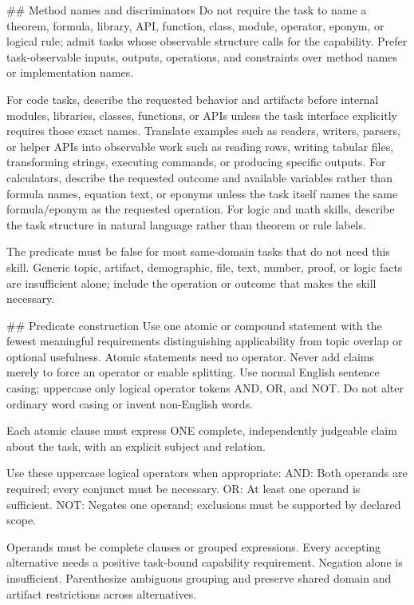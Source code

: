 \#\# Method names and discriminators Do not require the task to name a theorem, formula, library, API, function, class, module, operator, eponym, or logical rule; admit tasks whose observable structure calls for the capability. Prefer task-observable inputs, outputs, operations, and constraints over method names or implementation names.
\par\smallskip
For code tasks, describe the requested behavior and artifacts before internal modules, libraries, classes, functions, or APIs unless the task interface explicitly requires those exact names. Translate examples such as readers, writers, parsers, or helper APIs into observable work such as reading rows, writing tabular files, transforming strings, executing commands, or producing specific outputs. For calculators, describe the requested outcome and available variables rather than formula names, equation text, or eponyms unless the task itself names the same formula/eponym as the requested operation. For logic and math skills, describe the task structure in natural language rather than theorem or rule labels.
\par\smallskip
The predicate must be false for most same-domain tasks that do not need this skill. Generic topic, artifact, demographic, file, text, number, proof, or logic facts are insufficient alone; include the operation or outcome that makes the skill necessary.
\par\smallskip
\#\# Predicate construction Use one atomic or compound statement with the fewest meaningful requirements distinguishing applicability from topic overlap or optional usefulness. Atomic statements need no operator. Never add claims merely to force an operator or enable splitting. Use normal English sentence casing; uppercase only logical operator tokens AND, OR, and NOT. Do not alter ordinary word casing or invent non-English words.
\par\smallskip
Each atomic clause must express ONE complete, independently judgeable claim about the task, with an explicit subject and relation.
\par\smallskip
Use these uppercase logical operators when appropriate: AND: Both operands are required; every conjunct must be necessary. OR: At least one operand is sufficient. NOT: Negates one operand; exclusions must be supported by declared scope.
\par\smallskip
Operands must be complete clauses or grouped expressions. Every accepting alternative needs a positive task-bound capability requirement. Negation alone is insufficient. Parenthesize ambiguous grouping and preserve shared domain and artifact restrictions across alternatives.
